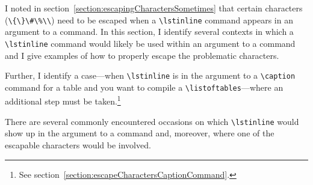 \documentclass[12pt,table,final]{article}%
\DeclareRobustCommand{\escapableCharactersJdrLst}{\lstinline|\{\}\#\%\\|\xspace}
\begin{document}
I noted in section~\ref{section:escapingCharactersSometimes} that certain characters (\escapableCharactersJdrLst) need to be escaped when a \lstinline|\lstinline| command appears in an argument to a command. In this section, I identify several contexts in which a \lstinline|\lstinline| command would likely be used within an argument to a command and I give examples of how to properly escape the problematic characters.

Further, I identify a case---when \lstinline|\lstinline| is in the argument to a \lstinline|\caption| command for a table and you want to compile a \lstinline|\listoftables|---where an additional step must be taken.\footnote{See section~\ref{section:escapeCharactersCaptionCommand}.}

There are several commonly encountered occasions on which \lstinline|\lstinline| would show up in the argument to a command and, moreover, where one of the escapable characters would be involved.
\end{document}
